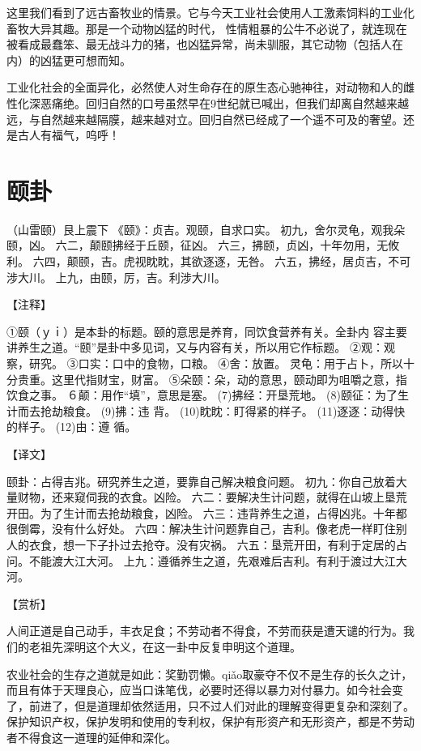 \documentclass[12pt,UTF8]{ctexbook}
\begin{document}
这里我们看到了远古畜牧业的情景。它与今天工业社会使用人工激素饲料的工业化畜牧大异其趣。那是一个动物凶猛的时代， 性情粗暴的公牛不必说了，就连现在被看成最蠢笨、最无战斗力的猪，也凶猛异常，尚未驯服，其它动物（包括人在内）的凶猛更可想而知。

工业化社会的全面异化，必然使人对生命存在的原生态心驰神往，对动物和人的雌性化深恶痛绝。回归自然的口号虽然早在9世纪就已喊出，但我们却离自然越来越远，与自然越来越隔膜，越来越对立。回归自然已经成了一个遥不可及的奢望。还是古人有福气，呜呼！

\chapter{颐卦}

（山雷颐）艮上震下
《颐》：贞吉。观颐，自求口实。
初九，舍尔灵龟，观我朵颐，凶。
六二，颠颐拂经于丘颐，征凶。
六三，拂颐，贞凶，十年勿用，无攸利。
六四，颠颐，吉。虎视眈眈，其欲逐逐，无咎。
六五，拂经，居贞吉，不可涉大川。
上九，由颐，厉，吉。利涉大川。

【注释】

①颐（ｙｉ）是本卦的标题。颐的意思是养育，同饮食营养有关。全卦内 容主要讲养生之道。“颐”是卦中多见词，又与内容有关，所以用它作标题。
②观：观察，研究。
③口实：口中的食物，口粮。
④舍：放置。 灵龟：用于占卜，所以十分贵重。这里代指财宝，财富。
⑤朵颐：朵，动的意思，颐动即为咀嚼之意，指饮食之事。
６颠：用作“填”，意思是塞。
(7)拂经：开垦荒地。
(8)颐征：为了生计而去抢劫粮食。
(9)拂：违 背。
(10)眈眈：盯得紧的样子。
(11)逐逐：动得快的样子。
(12)由：遵 循。

【译文】

颐卦：占得吉兆。研究养生之道，要靠自己解决粮食问题。
初九：你自己放着大量财物，还来窥伺我的衣食。凶险。
六二：要解决生计问题，就得在山坡上垦荒开田。为了生计而去抢劫粮食，凶险。
六三：违背养生之道，占得凶兆。十年都很倒霉，没有什么好处。
六四：解决生计问题靠自己，吉利。像老虎一样盯住别人的衣食，想一下子扑过去抢夺。没有灾祸。
六五：垦荒开田，有利于定居的占问。不能渡大江大河。
上九：遵循养生之道，先艰难后吉利。有利于渡过大江大河。

【赏析】

人间正道是自己动手，丰衣足食；不劳动者不得食，不劳而获是遭天谴的行为。我们的老祖先深明这个大义，在这一卦中反复申明这个道理。

农业社会的生存之道就是如此：奖勤罚懒。qiǎo取豪夺不仅不是生存的长久之计，而且有体于天理良心，应当口诛笔伐，必要时还得以暴力对付暴力。如今社会变了，前进了，但是道理却依然适用，只不过人们对此的理解变得更复杂和深刻了。保护知识产权，保护发明和使用的专利权，保护有形资产和无形资产，都是不劳动者不得食这一道理的延伸和深化。
\end{document}
